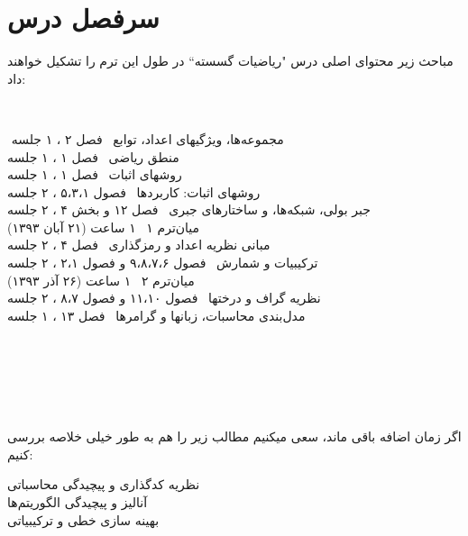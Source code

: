 \documentclass[a4paper]{arman-syllabus}
\begin{document}
{\section*{سرفصل درس}
مباحث زیر محتوای اصلی درس "ریاضیات گسسته`` در طول این ترم را تشکیل خواهند داد:
\begin{center} \begin{minipage}{5.8in}‎
‎\begin{flushleft}‎
مجموعه‌ها، ویژگیهای اعداد، توابع  \dotfill 
~فصل ۲ \lr{[R]}، ۱ جلسه \\
منطق ریاضی \dotfill  ~فصل ۱ \lr{[R]}، ۱ جلسه \\
 روشهای اثبات \dotfill  ~فصل ۱ \lr{[R]}، ۱ جلسه \\
   روشهای اثبات: کاربردها \dotfill ~فصول ۵،۳،۱   \lr{[R]}، ۲ جلسه \\
   جبر بولی، شبکه‌ها، و ساختارهای جبری \dotfill ~فصل ۱۲ \lr{[R]} و بخش ۴ \lr{[G]}، ۲ جلسه \\
   {\Large{\HandPencilLeft}} 
   میان‌ترم ۱ \dotfill  ~۱ ساعت (۲۱ آبان ۱۳۹۳) \\
مبانی نظریه اعداد و رمزگذاری \dotfill ~فصل ۴ \lr{[R]}، ۲ جلسه \\ 
  ترکیبیات و شمارش \dotfill  ~فصول ۹،۸،۷،۶ \lr{[R]} و فصول ۲،۱ \lr{[L]}، ۲ جلسه \\
  {\Large{\HandPencilLeft}} 
     میان‌ترم ۲ \dotfill   ~۱ ساعت (۲۶ آذر ۱۳۹۳) \\
نظریه‌ گراف و درختها  \dotfill  ~فصول ۱۱،۱۰ \lr{[R]} و فصول ۸،۷ \lr{[L]}، ۲ جلسه \\
 مدل‌بندی محاسبات، زبانها و گرامرها \dotfill ~فصل ۱۳ \lr{[R]}، ۱ جلسه
 \end{flushleft}‎
‎\end{minipage}‎
‎\end{center}‎


اگر زمان اضافه باقی ماند، سعی میکنیم مطالب زیر را هم به طور خیلی خلاصه بررسی کنیم:
\begin{center} 
\begin{minipage}{5.8in}
\begin{flushright}
نظریه کدگذاری و پیچیدگی محاسباتی \dotfill \\
آنالیز و پیچیدگی الگوریتم‌ها \dotfill \\
بهینه سازی خطی و ترکیبیاتی  \dotfill 
\end{flushright} \end{minipage} \end{center}

}
\end{document}
